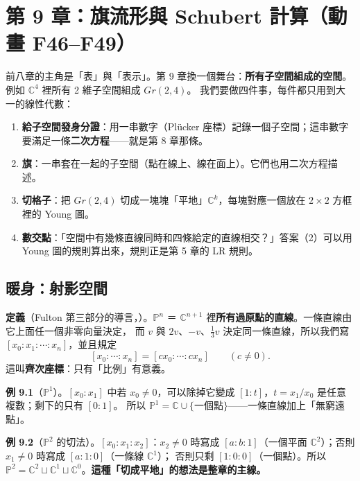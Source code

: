 
\section{第 9 章：旗流形與 Schubert 計算（動畫 F46--F49）}\label{sec:f-ch9}

\begin{keybox}
前八章的主角是「表」與「表示」。第 9 章換一個舞台：\textbf{所有子空間組成的空間}。例如 $\mathbb C^4$ 裡所有 2 維子空間組成 $Gr(2,4)$。
我們要做四件事，每件都只用到大一的線性代數：
\begin{enumerate}[nosep]
\item \textbf{給子空間發身分證}：用一串數字（Plücker 座標）記錄一個子空間；這串數字要滿足一條\textbf{二次方程}——就是第 8 章那條。
\item \textbf{旗}：一串套在一起的子空間（點在線上、線在面上）。它們也用二次方程描述。
\item \textbf{切格子}：把 $Gr(2,4)$ 切成一塊塊「平地」$\mathbb C^k$，每塊對應一個放在 $2\times2$ 方框裡的 Young 圖。
\item \textbf{數交點}：「空間中有幾條直線同時和四條給定的直線相交？」答案（2）可以用 Young 圖的規則算出來，規則正是第 5 章的 LR 規則。
\end{enumerate}
\end{keybox}

\subsection{暖身：射影空間}\label{sec:f-proj}

\textbf{定義}（Fulton 第三部分的導言，）。$\mathbb P^n$ ＝ $\mathbb C^{n+1}$ 裡\textbf{所有過原點的直線}。一條直線由它上面任一個非零向量決定，
而 $v$ 與 $2v$、$-v$、$\tfrac13v$ 決定同一條直線，所以我們寫 $[x_0:x_1:\cdots:x_n]$，並且規定
\[
[x_0:\cdots:x_n]=[cx_0:\cdots:cx_n]\qquad(c\ne0).
\]
這叫\textbf{齊次座標}：只有「比例」有意義。

\textbf{例 9.1}（$\mathbb P^1$）。$[x_0:x_1]$ 中若 $x_0\ne0$，可以除掉它變成 $[1:t]$，$t=x_1/x_0$ 是任意複數；剩下的只有 $[0:1]$。
所以 $\mathbb P^1=\mathbb C\cup\{\text{一個點}\}$——一條直線加上「無窮遠點」。

\textbf{例 9.2}（$\mathbb P^2$ 的切法）。$[x_0:x_1:x_2]$：$x_2\ne0$ 時寫成 $[a:b:1]$（一個平面 $\mathbb C^2$）；否則 $x_1\ne0$ 時寫成 $[a:1:0]$（一條線 $\mathbb C^1$）；
否則只剩 $[1:0:0]$（一個點）。所以 $\mathbb P^2=\mathbb C^2\sqcup\mathbb C^1\sqcup\mathbb C^0$。\textbf{這種「切成平地」的想法是整章的主線。}

